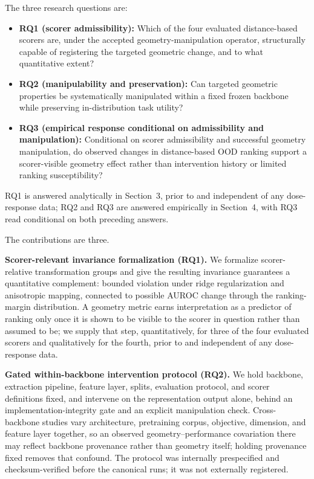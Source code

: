 \documentclass[11pt,a4paper]{article}
\begin{document}
The three research questions are:
\begin{itemize}
\item \textbf{RQ1 (scorer admissibility):} Which of the four evaluated distance-based scorers are, under the accepted geometry-manipulation operator, structurally capable of registering the targeted geometric change, and to what quantitative extent?
\item \textbf{RQ2 (manipulability and preservation):} Can targeted geometric properties be systematically manipulated within a fixed frozen backbone while preserving in-distribution task utility?
\item \textbf{RQ3 (empirical response conditional on admissibility and manipulation):} Conditional on scorer admissibility and successful geometry manipulation, do observed changes in distance-based OOD ranking support a scorer-visible geometry effect rather than intervention history or limited ranking susceptibility?
\end{itemize}

RQ1 is answered analytically in Section~3, prior to and independent of any dose-response data; RQ2 and RQ3 are answered empirically in Section~4, with RQ3 read conditional on both preceding answers.

The contributions are three.

\textbf{Scorer-relevant invariance formalization (RQ1).} We formalize scorer-relative transformation groups and give the resulting invariance guarantees a quantitative complement: bounded violation under ridge regularization and anisotropic mapping, connected to possible AUROC change through the ranking-margin distribution. A geometry metric earns interpretation as a predictor of ranking only once it is shown to be visible to the scorer in question rather than assumed to be; we supply that step, quantitatively, for three of the four evaluated scorers and qualitatively for the fourth, prior to and independent of any dose-response data.

\textbf{Gated within-backbone intervention protocol (RQ2).} We hold backbone, extraction pipeline, feature layer, splits, evaluation protocol, and scorer definitions fixed, and intervene on the representation output alone, behind an implementation-integrity gate and an explicit manipulation check. Cross-backbone studies vary architecture, pretraining corpus, objective, dimension, and feature layer together, so an observed geometry--performance covariation there may reflect backbone provenance rather than geometry itself; holding provenance fixed removes that confound. The protocol was internally prespecified and checksum-verified before the canonical runs; it was not externally registered.
\end{document}
